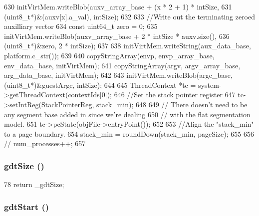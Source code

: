 \begin{DoxyCode}
{{630         initVirtMem.writeBlob(auxv_array_base + (x * 2 + 1) * intSize,
631                 (uint8_t*)&(auxv[x].a_val), intSize);
632     }
633     //Write out the terminating zeroed auxilliary vector
634     const uint64_t zero = 0;
635     initVirtMem.writeBlob(auxv_array_base + 2 * intSize * auxv.size(),
636             (uint8_t*)&zero, 2 * intSize);
637 
638     initVirtMem.writeString(aux_data_base, platform.c_str());
639 
640     copyStringArray(envp, envp_array_base, env_data_base, initVirtMem);
641     copyStringArray(argv, argv_array_base, arg_data_base, initVirtMem);
642 
643     initVirtMem.writeBlob(argc_base, (uint8_t*)&guestArgc, intSize);
644 
645     ThreadContext *tc = system->getThreadContext(contextIds[0]);
646     //Set the stack pointer register
647     tc->setIntReg(StackPointerReg, stack_min);
648 
649     // There doesn't need to be any segment base added in since we're dealing
650     // with the flat segmentation model.
651     tc->pcState(objFile->entryPoint());
652 
653     //Align the "stack_min" to a page boundary.
654     stack_min = roundDown(stack_min, pageSize);
655 
656 //    num_processes++;
657 }
\end{DoxyCode}
\hypertarget{classX86ISA_1_1X86LiveProcess_abf5ae8f7b5ef9fdfd43c7b783fd540b1}{
\subsubsection[{gdtSize}]{ gdtSize ()}}
\label{classX86ISA_1_1X86LiveProcess_abf5ae8f7b5ef9fdfd43c7b783fd540b1}



\begin{DoxyCode}
78         { return _gdtSize; }
\end{DoxyCode}
\hypertarget{classX86ISA_1_1X86LiveProcess_a3fa3a6673b5b14edb04c4b8dfdb46051}{
\subsubsection[{gdtStart}]{ gdtStart ()}}
\label{classX86ISA_1_1X86LiveProcess_a3fa3a6673b5b14edb04c4b8dfdb46051}



